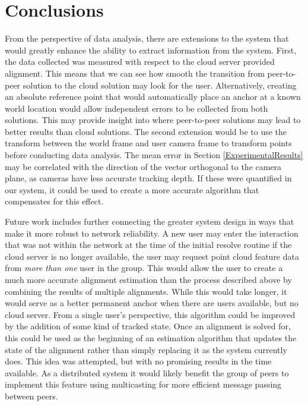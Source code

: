\documentclass{vgtc}                          %
\begin{document}


\section{Conclusions}

From the perspective of data analysis, there are extensions to the system that would greatly enhance the 
ability to extract information from the system. First, the data collected was measured with respect to the cloud server provided 
alignment. This means that we can see how smooth the transition from peer-to-peer solution to the cloud solution may look 
for the user. Alternatively, creating an absolute reference point that would automatically place an anchor at a known world location would 
allow independent errors to be collected from both solutions. This may provide insight into where peer-to-peer solutions 
may lead to better results than cloud solutions. The second extension would be to use the transform between the world frame and 
user camera frame to transform points before conducting data analysis. The mean error in Section \ref{ExperimentalResults} may be correlated 
with the direction of the vector orthogonal to the camera plane, as cameras have less accurate tracking depth. If these were quantified in our 
system, it could be used to create a more accurate algorithm that compensates for this effect.

Future work includes further connecting the greater system design in ways that make it more 
robust to network reliability. A new user may enter the interaction that was not within the network
at the time of the initial resolve routine if the cloud server is no longer available, the user may request 
point cloud feature data from \textit{more than one} user in the group. This would allow the user to create a 
much more accurate alignment estimation than the process described above by combining the results of multiple
alignments. While this would take longer, it would serve as a better permanent anchor when there are users
available, but no cloud server. From a single user's perspective, this algorithm could be improved by 
the addition of some kind of tracked state. Once an alignment is solved for, this could be used as the beginning 
of an estimation algorithm that updates the state of the alignment rather than simply replacing it as 
the system currently does. This idea was attempted, but with no promising results in the time available. As a distributed system it would likely 
benefit the group of peers to implement this feature using multicasting for more efficient message passing between peers.
\end{document}
